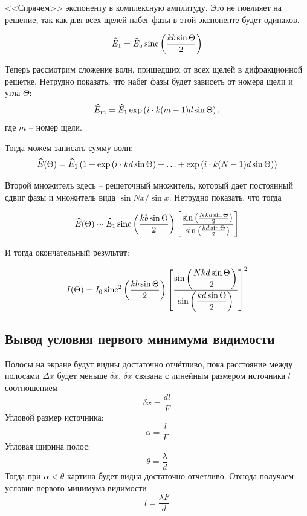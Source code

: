 <<Спрячем>> экспоненту в комплексную амплитуду. Это не повлияет на решение, так как для всех щелей набег фазы в этой экспоненте будет одинаков.

\begin{equation}
	\widehat{E}_{1}=\widehat{E}_{a}\operatorname{sinc}\left(\frac{k b \sin\Theta}{2}\right)
\end{equation}

Теперь рассмотрим сложение волн, пришедших от всех щелей в дифракционной решетке. Нетрудно показать, что набег фазы будет зависеть от номера щели и угла $\Theta$:
\begin{equation}
	\widehat{E}_m=\widehat{E}_{1}\exp\left(i\cdot k (m-1)d\sin\Theta\right),
\end{equation}
где $m$ -- номер щели.

Тогда можем записать сумму волн:
\begin{equation}
	\widehat{E}(\Theta)=\widehat{E}_1 \left(
		1+\exp\left(i\cdot kd\sin\Theta\right)+\ldots+\exp\left(i\cdot k (N-1)d\sin\Theta\right)
	\right)
\end{equation}

Второй множитель здесь -- решеточный множитель, который дает постоянный сдвиг фазы и множитель вида $\sin  Nx / \sin x$. Нетрудно показать, что тогда

\begin{equation}
	\widehat{E}(\Theta) \sim \widehat{E}_1 \operatorname{sinc}\left(\frac{k b \sin\Theta}{2}\right)
	\left[
		\frac{\sin\left(\frac{Nk d \sin\Theta}{2}\right)}{\sin\left(\frac{k d \sin\Theta}{2}\right)}
	\right]
\end{equation}

И тогда окончательный результат:

\begin{equation}
	\label{eq:intensity}
	I(\Theta) = I_0 \operatorname{sinc}^2\left(\frac{k b \sin\Theta}{2}\right)
	\left[
		\frac{\displaystyle\sin\left(\frac{Nk d \sin\Theta}{2}\right)}{\displaystyle\sin\left(\frac{k d \sin\Theta}{2}\right)}
	\right]^2
\end{equation}

\subsection{Вывод условия первого минимума видимости}
Полосы на экране будут видны достаточно отчётливо, пока расстояние между полосами $\Delta x$ будет меньше $\delta x$.
$\delta x$ связана с линейным размером источника $l$ соотношением
\begin{equation}
	\delta x=\frac{dl}{F}
\end{equation}
Угловой размер источника:
\begin{equation}
	\alpha=\frac{l}{F}
\end{equation}
Угловая ширина полос:
\begin{equation}
	\theta=\frac{\lambda}{d}
\end{equation}
Тогда при $\alpha<\theta$ картина будет видна достаточно отчетливо.
Отсюда получаем условие первого минимума видимости
\begin{equation}
	l=\frac{\lambda F}{d}
\end{equation}




